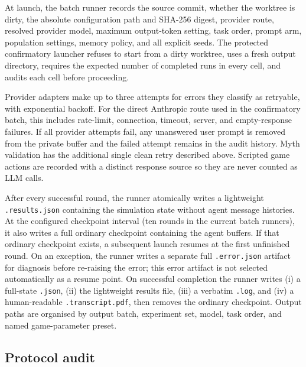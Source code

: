 At launch, the batch runner records the source commit, whether the worktree is
dirty, the absolute configuration path and SHA-256 digest, provider route,
resolved provider model, maximum output-token setting, task order, prompt arm,
population settings, memory policy, and all explicit seeds. The protected
confirmatory launcher refuses to start from a dirty worktree, uses a fresh
output directory, requires the expected number of completed runs in every
cell, and audits each cell before proceeding.

Provider adapters make up to three attempts for errors they classify as
retryable, with exponential backoff. For the direct Anthropic route used in the
confirmatory batch, this includes rate-limit, connection, timeout, server, and
empty-response failures. If all provider attempts fail, any unanswered user
prompt is removed from the private buffer and the failed attempt remains in the
audit history. Myth validation has the additional single clean retry described
above. Scripted game actions are recorded with a distinct response source so
they are never counted as LLM calls.

After every successful round, the runner atomically writes a lightweight
\texttt{.results.json} containing the simulation state without agent message
histories. At the configured checkpoint interval (ten rounds in the current
batch runners), it also writes a full ordinary checkpoint containing the agent
buffers. If that ordinary checkpoint exists, a subsequent launch resumes at
the first unfinished round. On an exception, the runner writes a separate full
\texttt{.error.json} artifact for diagnosis before re-raising the error; this
error artifact is not selected automatically as a resume point. On successful
completion the runner writes (i) a full-state \texttt{.json}, (ii) the
lightweight results file, (iii) a verbatim \texttt{.log}, and (iv) a
human-readable \texttt{.transcript.pdf}, then removes the ordinary checkpoint.
Output paths are organised by output batch, experiment set, model, task order,
and named game-parameter preset.

\subsection{Protocol audit}
\label{sec:protocol-audit}

